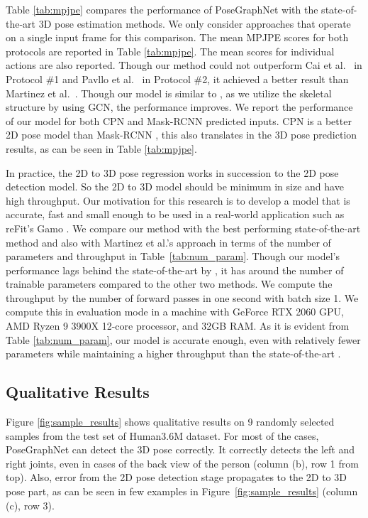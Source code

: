 \documentclass{article}
\begin{document}
Table \ref{tab:mpjpe} compares the performance of PoseGraphNet with the state-of-the-art 3D pose estimation methods.
We only consider approaches that operate on a single input frame for this comparison.
The mean MPJPE scores for both protocols are reported in Table \ref{tab:mpjpe}.
The mean scores for individual actions are also reported.
Though our method could not outperform Cai et al.~\cite{Cai2019} in Protocol \#1 and Pavllo et al.~\cite{Pavllo2019} in Protocol \#2, it achieved a better result than Martinez et al.~\cite{Martinez2017}.
Though our model is similar to \cite{Martinez2017}, as we utilize the skeletal structure by using GCN, the performance improves.
We report the performance of our model for both CPN \cite{Chen2018} and Mask-RCNN \cite{he2017mask} predicted inputs.
CPN is a better 2D pose model than Mask-RCNN \cite{Chen2018}, this also translates in the 3D pose prediction results, as can be seen in Table \ref{tab:mpjpe}.

In practice, the 2D to 3D pose regression works in succession to the 2D pose detection model.
So the 2D to 3D model should be minimum in size and have high throughput.
Our motivation for this research is to develop a model that is accurate, fast and small enough to be used in a real-world application such as reFit's Gamo \cite{refit}.
We compare our method with the best performing state-of-the-art method \cite{Cai2019} and also with Martinez et al.'s approach \cite{Martinez2017} in terms of the number of parameters and throughput in Table~\ref{tab:num_param}.
Though our model's performance lags behind the state-of-the-art \cite{Cai2019} by , it has around  the number of trainable parameters compared to the other two methods.
We compute the throughput by the number of forward passes in one second with batch size 1.
We compute this in evaluation mode in a machine with GeForce RTX 2060 GPU, AMD Ryzen 9 3900X 12-core processor, and 32GB RAM.
As it is evident from Table \ref{tab:num_param}, our model is accurate enough, even with relatively fewer parameters while maintaining a higher throughput than the state-of-the-art \cite{Cai2019}.

\subsection{Qualitative Results}
Figure \ref{fig:sample_results} shows qualitative results on 9 randomly selected samples from the test set of Human3.6M dataset.
For most of the cases, PoseGraphNet can detect the 3D pose correctly.
It correctly detects the left and right joints, even in cases of the back view of the person (column (b), row 1 from top).
Also, error from the 2D pose detection stage propagates to the 2D to 3D pose part, as can be seen in few examples in Figure~\ref{fig:sample_results} (column (c), row 3).
\end{document}
